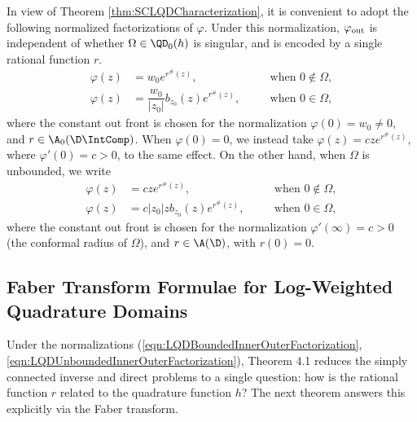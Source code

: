\documentclass{article}
\numberwithin{equation}{section}
\begin{document}
In view of Theorem \ref{thm:SCLQDCharacterization}, it is convenient to adopt the following normalized factorizations of $\varphi$. Under this normalization, $\varphi_{\rm out}$ is independent of whether $\Omega\in\QD_0(h)$ is singular, and is encoded by a single rational function $r$.
\begin{equation}\label{eqn:LQDBoundedInnerOuterFactorization}
\begin{alignedat}{2}
    \varphi(z)&=w_0e^{r^{\#}(z)},\quad&&\text{when }0\notin\Omega,\\
    \varphi(z)&=\dfrac{w_0}{|z_0|}b_{z_0}(z)e^{r^{\#}(z)},\quad&&\text{when }0\in\Omega,
\end{alignedat}
\end{equation}
where the constant out front is chosen for the normalization $\varphi(0)=w_0\neq0$, and $r\in\A_0(\D\IntComp)$. When $\varphi(0)=0$, we instead take $\varphi(z)=cze^{r^{\#}(z)}$, where $\varphi'(0)=c>0$, to the same effect. On the other hand, when $\Omega$ is unbounded, we write
\begin{equation}\label{eqn:LQDUnboundedInnerOuterFactorization}
\begin{alignedat}{2}
    \varphi(z)&=cze^{r^{\#}(z)},\quad&&\text{when }0\notin\Omega,\\
    \varphi(z)&=c|z_0|zb_{z_0}(z)e^{r^{\#}(z)},\quad&&\text{when }0\in\Omega,
\end{alignedat}
\end{equation}
where the constant out front is chosen for the normalization $\varphi'(\infty)=c>0$ (the conformal radius of $\Omega$), and $r\in\A(\D)$, with $r(0)=0$.


\subsection{Faber Transform Formulae for Log-Weighted Quadrature Domains}
Under the normalizations (\ref{eqn:LQDBoundedInnerOuterFactorization}, \ref{eqn:LQDUnboundedInnerOuterFactorization}), Theorem 4.1 reduces the simply connected inverse and direct problems to a single question: how is the rational function $r$ related to the quadrature function $h$? The next theorem answers this explicitly via the Faber transform.
\end{document}
